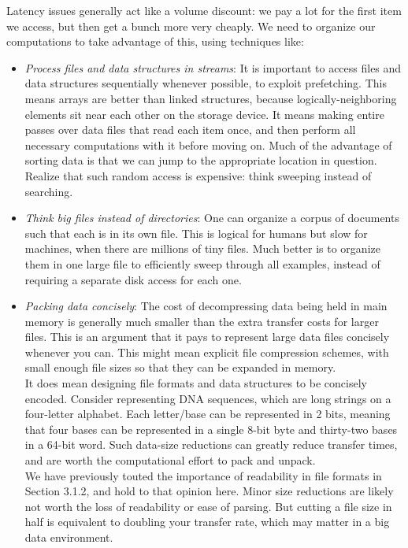 \documentclass[10pt]{article}
\begin{document}
\begin{enumerate}
Latency issues generally act like a volume discount: we pay a lot for the first item we access, but then get a bunch more very cheaply. We need to organize our computations to take advantage of this, using techniques like:
\begin{itemize}
    \item \textit{Process files and data structures in streams}: It is important to access files and data structures sequentially whenever possible, to exploit prefetching. This means arrays are better than linked structures, because logically-neighboring elements sit near each other on the storage device. It means making entire passes over data files that read each item once, and then perform all necessary computations with it before moving on. Much of the advantage of sorting data is that we can jump to the appropriate location in question. Realize that such random access is expensive: think sweeping instead of searching.
    \item \textit{Think big files instead of directories}: One can organize a corpus of documents such that each is in its own file. This is logical for humans but slow for machines, when there are millions of tiny files. Much better is to organize them in one large file to efficiently sweep through all examples, instead of requiring a separate disk access for each one.
    \item \textit{Packing data concisely}: The cost of decompressing data being held in main memory is generally much smaller than the extra transfer costs for larger files. This is an argument that it pays to represent large data files concisely whenever you can. This might mean explicit file compression schemes, with small enough file sizes so that they can be expanded in memory.\\
    It does mean designing file formats and data structures to be concisely encoded. Consider representing DNA sequences, which are long strings on a four-letter alphabet. Each letter/base can be represented in 2 bits, meaning that four bases can be represented in a single 8-bit byte and thirty-two bases in a 64-bit word. Such data-size reductions can greatly reduce transfer times, and are worth the computational effort to pack and unpack.\\
    We have previously touted the importance of readability in file formats in Section 3.1.2, and hold to that opinion here. Minor size reductions are likely not worth the loss of readability or ease of parsing. But cutting a file size in half is equivalent to doubling your transfer rate, which may matter in a big data environment.
\end{itemize}


\end{enumerate}
\end{document}
